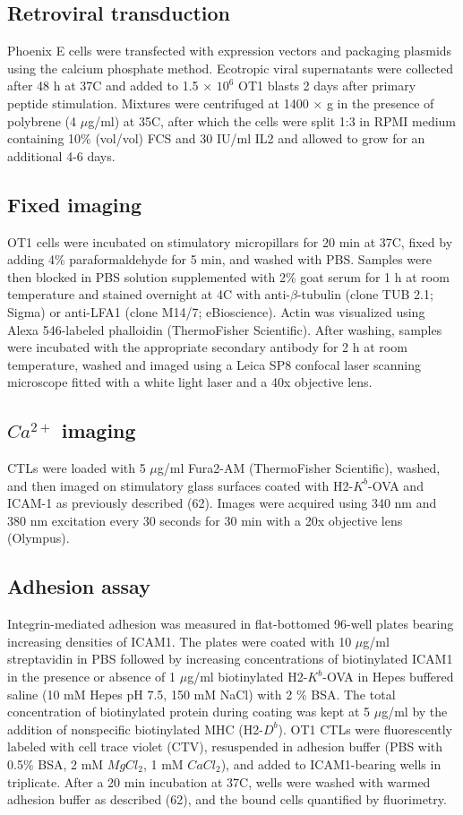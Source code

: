 \subsection{Retroviral transduction}
Phoenix E cells were transfected with expression vectors and packaging plasmids using the calcium phosphate method. Ecotropic viral supernatants were collected after 48 h at 37\degree C and added to 1.5 × $10^{6}$ OT1 blasts 2 days after primary peptide stimulation. Mixtures were centrifuged at 1400 × g in the presence of polybrene (4 $\mu$g/ml) at 35\degree C, after which the cells were split 1:3 in RPMI medium containing 10\% (vol/vol) FCS and 30 IU/ml IL2 and allowed to grow for an additional 4-6 days.

\subsection{Fixed imaging}
OT1 cells were incubated on stimulatory micropillars for 20 min at 37\degree C, fixed by adding 4\% paraformaldehyde for 5 min, and washed with PBS. Samples were then blocked in PBS solution supplemented with 2\% goat serum for 1 h at room temperature and stained overnight at 4\degree C with anti-$\beta$-tubulin (clone TUB 2.1; Sigma) or anti-LFA1 (clone M14/7; eBioscience). Actin was visualized using Alexa 546-labeled phalloidin (ThermoFisher Scientific). After washing, samples were incubated with the appropriate secondary antibody for 2 h at room temperature, washed and imaged using a Leica SP8 confocal laser scanning microscope fitted with a white light laser and a 40x objective lens.

\subsection{$Ca^{2+}$ imaging}
CTLs were loaded with 5 $\mu$g/ml Fura2-AM (ThermoFisher Scientific), washed, and then imaged on stimulatory glass surfaces coated with H2-$K^{b}$-OVA and ICAM-1 as previously described (62). Images were acquired using 340 nm and 380 nm excitation every 30 seconds for 30 min with a 20x objective lens (Olympus).

\subsection{Adhesion assay}
Integrin-mediated adhesion was measured in flat-bottomed 96-well plates bearing increasing densities of ICAM1. The plates were coated with 10 $\mu$g/ml streptavidin in PBS followed by increasing concentrations of biotinylated ICAM1 in the presence or absence of 1 $\mu$g/ml biotinylated H2-$K^{b}$-OVA in Hepes buffered saline (10 mM Hepes pH 7.5, 150 mM NaCl) with 2 \% BSA. The total concentration of biotinylated protein during coating was kept at 5 $\mu$g/ml by the addition of nonspecific biotinylated MHC (H2-$D^{b}$). OT1 CTLs were fluorescently labeled with cell trace violet (CTV), resuspended in adhesion buffer (PBS with 0.5\% BSA, 2 mM $MgCl_2$, 1 mM $CaCl_2$), and added to ICAM1-bearing wells in triplicate. After a 20 min incubation at 37\degree C, wells were washed with warmed adhesion buffer as described (62), and the bound cells quantified by fluorimetry.

